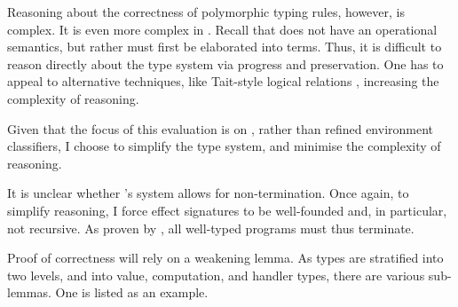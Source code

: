 Reasoning about the correctness of polymorphic typing rules, however, is complex. It is even more complex in \calculusName{}. Recall that \sourceLang{} does not have an operational semantics, but rather must first be elaborated into \coreLang{} terms. Thus, it is difficult to reason directly about the \sourceLang{} type system via progress and preservation. One has to appeal to alternative techniques, like Tait-style logical relations \citep{tait-67}, increasing the complexity of reasoning.

Given that the focus of this evaluation is on \sourceLang{}, rather than refined environment classifiers, I choose to simplify the type system, and minimise the complexity of reasoning. 

It is unclear whether \citeauthor{isoda-24}'s system allows for non-termination. Once again, to simplify reasoning, I force effect signatures to be well-founded and, in particular, not recursive. As proven by \citet{kammar-2013}, all well-typed programs must thus terminate. 

Proof of correctness will rely on a weakening lemma. As types are stratified into two levels, and into value, computation, and handler types, there are various sub-lemmas. One is listed as an example.

\newcommand{\rcqtypejudge}[4][\Gamma]{{#1} \vdash_{\compilemode \mid \quotemode}^{#2} {#3} : {#4}}
\newcommand{\rctypejudge}[4][\Gamma]{{#1} \vdash_{\compilemode}^{#2} {#3} : {#4}}
\newcommand{\rqtypejudge}[4][\Gamma]{{#1} \vdash_{\quotemode}^{#2} {#3}: {#4}}
\newcommand{\rstypejudge}[3][\Gamma]{{#1} \vdash_{\splicemode} {#2} : {#3}}

